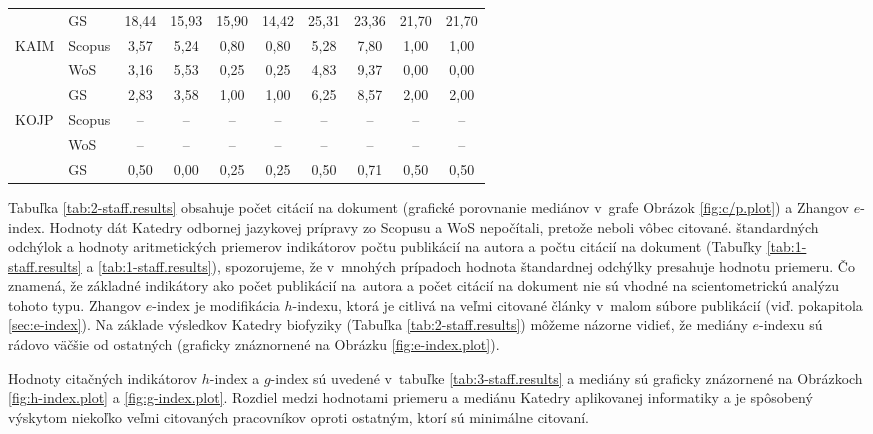 \begin{table}
\begin{tabularx}{\textwidth}{XXcccc@{\hspace{3ex}}cccc}
      & GS     & 18,44       & 15,93 & 15,90 & 14,42 & 25,31   & 23,36 & 21,70 & 21,70 \\[3ex]
 KAIM & Scopus & 3,57        & 5,24  & 0,80  & 0,80  & 5,28    & 7,80  & 1,00  & 1,00  \\
      & WoS    & 3,16        & 5,53  & 0,25  & 0,25  & 4,83    & 9,37  & 0,00  & 0,00  \\
      & GS     & 2,83        & 3,58  & 1,00  & 1,00  & 6,25    & 8,57  & 2,00  & 2,00  \\[3ex]
 KOJP & Scopus & --          & --    & --    & --    & --      & --    & --    & --    \\
      & WoS    & --          & --    & --    & --    & --      & --    & --    & --    \\
      & GS     & 0,50        & 0,00  & 0,25  & 0,25  & 0,50    & 0,71  & 0,50  & 0,50  \\[0.5ex]
  \bottomrule
\end{tabularx}
\end{table}

Tabuľka \ref{tab:2-staff.results} obsahuje počet citácií na dokument (grafické
porovnanie mediánov v~grafe Obrázok \ref{fig:c/p.plot}) a Zhangov $e$-index.
Hodnoty dát Katedry odbornej jazykovej prípravy zo Scopusu a WoS nepočítali,
pretože neboli vôbec citované.  štandardných odchýlok a hodnoty aritmetických
priemerov indikátorov počtu publikácií na autora a počtu citácií na dokument
(Tabuľky \ref{tab:1-staff.results} a \ref{tab:1-staff.results}), spozorujeme, že
v~mnohých prípadoch hodnota štandardnej odchýlky presahuje hodnotu priemeru.  Čo
znamená, že základné indikátory ako počet publikácií na~autora a počet citácií
na dokument nie sú vhodné na scientometrickú analýzu tohoto typu.  Zhangov
$e$-index  je modifikácia $h$-indexu, ktorá je citlivá na veľmi citované články
v~malom súbore publikácií (viď. pokapitola \ref{sec:e-index}).  Na základe
výsledkov Katedry biofyziky (Tabuľka \ref{tab:2-staff.results}) môžeme názorne
vidieť, že mediány $e$-indexu sú rádovo väčšie od ostatných (graficky
znáznornené na Obrázku \ref{fig:e-index.plot}).

Hodnoty citačných indikátorov $h$-index a $g$-index sú uvedené v~tabuľke
\ref{tab:3-staff.results} a mediány sú graficky znázornené na Obrázkoch
\ref{fig:h-index.plot} a \ref{fig:g-index.plot}.  Rozdiel medzi hodnotami
priemeru a mediánu Katedry aplikovanej informatiky a je spôsobený výskytom
niekoľko veľmi citovaných pracovníkov oproti ostatným, ktorí sú minimálne
citovaní.

